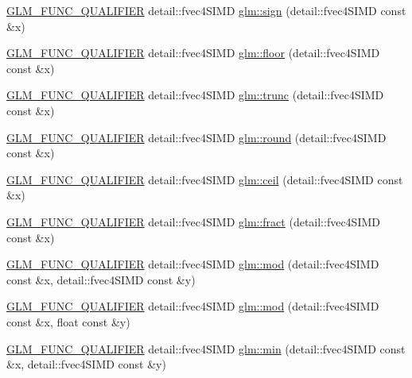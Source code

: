 \begin{DoxyCompactItemize}
\item 
\hyperlink{setup_8hpp_a33fdea6f91c5f834105f7415e2a64407}{G\+L\+M\+\_\+\+F\+U\+N\+C\+\_\+\+Q\+U\+A\+L\+I\+F\+I\+ER} detail\+::fvec4\+S\+I\+MD \hyperlink{namespaceglm_af67d3ef2ca567fe890c09a8fa26328bf}{glm\+::sign} (detail\+::fvec4\+S\+I\+MD const \&x)
\item 
\hyperlink{setup_8hpp_a33fdea6f91c5f834105f7415e2a64407}{G\+L\+M\+\_\+\+F\+U\+N\+C\+\_\+\+Q\+U\+A\+L\+I\+F\+I\+ER} detail\+::fvec4\+S\+I\+MD \hyperlink{namespaceglm_a96b854694bd3ae049376cbdba57f2599}{glm\+::floor} (detail\+::fvec4\+S\+I\+MD const \&x)
\item 
\hyperlink{setup_8hpp_a33fdea6f91c5f834105f7415e2a64407}{G\+L\+M\+\_\+\+F\+U\+N\+C\+\_\+\+Q\+U\+A\+L\+I\+F\+I\+ER} detail\+::fvec4\+S\+I\+MD \hyperlink{namespaceglm_a9209720f29f7ce2e879af12191051927}{glm\+::trunc} (detail\+::fvec4\+S\+I\+MD const \&x)
\item 
\hyperlink{setup_8hpp_a33fdea6f91c5f834105f7415e2a64407}{G\+L\+M\+\_\+\+F\+U\+N\+C\+\_\+\+Q\+U\+A\+L\+I\+F\+I\+ER} detail\+::fvec4\+S\+I\+MD \hyperlink{namespaceglm_ac38130a4224e740980925150ea8dae5e}{glm\+::round} (detail\+::fvec4\+S\+I\+MD const \&x)
\item 
\hyperlink{setup_8hpp_a33fdea6f91c5f834105f7415e2a64407}{G\+L\+M\+\_\+\+F\+U\+N\+C\+\_\+\+Q\+U\+A\+L\+I\+F\+I\+ER} detail\+::fvec4\+S\+I\+MD \hyperlink{namespaceglm_adc50f5413973998fb007fda7a6149ef5}{glm\+::ceil} (detail\+::fvec4\+S\+I\+MD const \&x)
\item 
\hyperlink{setup_8hpp_a33fdea6f91c5f834105f7415e2a64407}{G\+L\+M\+\_\+\+F\+U\+N\+C\+\_\+\+Q\+U\+A\+L\+I\+F\+I\+ER} detail\+::fvec4\+S\+I\+MD \hyperlink{namespaceglm_a5a003d7f27903c03744ca6271f1a9051}{glm\+::fract} (detail\+::fvec4\+S\+I\+MD const \&x)
\item 
\hyperlink{setup_8hpp_a33fdea6f91c5f834105f7415e2a64407}{G\+L\+M\+\_\+\+F\+U\+N\+C\+\_\+\+Q\+U\+A\+L\+I\+F\+I\+ER} detail\+::fvec4\+S\+I\+MD \hyperlink{namespaceglm_a560289b95e600d6da427ad473c1f46cf}{glm\+::mod} (detail\+::fvec4\+S\+I\+MD const \&x, detail\+::fvec4\+S\+I\+MD const \&y)
\item 
\hyperlink{setup_8hpp_a33fdea6f91c5f834105f7415e2a64407}{G\+L\+M\+\_\+\+F\+U\+N\+C\+\_\+\+Q\+U\+A\+L\+I\+F\+I\+ER} detail\+::fvec4\+S\+I\+MD \hyperlink{namespaceglm_a66a9b0ed141fd219673b9adf8e400ec0}{glm\+::mod} (detail\+::fvec4\+S\+I\+MD const \&x, float const \&y)
\item 
\hyperlink{setup_8hpp_a33fdea6f91c5f834105f7415e2a64407}{G\+L\+M\+\_\+\+F\+U\+N\+C\+\_\+\+Q\+U\+A\+L\+I\+F\+I\+ER} detail\+::fvec4\+S\+I\+MD \hyperlink{namespaceglm_af6ef9739a4145dc0004408132eff235b}{glm\+::min} (detail\+::fvec4\+S\+I\+MD const \&x, detail\+::fvec4\+S\+I\+MD const \&y)

\end{DoxyCompactItemize}
